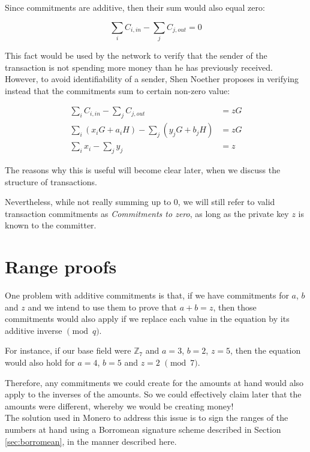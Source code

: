 Since commitments are additive, then their sum would also equal zero:

\[\sum_{i}{C_{i, in}}     - \sum_{j}{C_{j, out}} = 0\]


This fact would be used by the network to verify that the sender of the transaction is not spending more money
than he has previously received.
\\

However, to avoid identifiability of a sender, Shen Noether proposes in \cite{cryptoeprint:2015:1098} verifying instead that the commitments sum to certain non-zero value:

\begin{align*}
\sum_{i}{C_{i, in}}     - \sum_{j}{C_{j, out}} &= z G \\
\sum_{i}{(x_i G + a_i H)}  - \sum_{j}{(y_j G + b_j H)} &= z G \\
\sum_{i} x_i - \sum_{j} y_j &= z
\end{align*}

The reasons why this is useful will become clear later, when we discuss the structure of transactions. 

Nevertheless, while not really summing up to \(0\), we will still refer to valid transaction commitments as {\em Commitments to zero}, as long as the private key \(z\) is known to the committer.




\section{Range proofs}
\label{sec:range_proofs}

One problem with additive commitments is that, if we have commitments for \(a\), \(b\) and \(z\) and we intend to use them to prove that \(a + b = z\), then those commitments would also apply if we replace each value in the equation by its additive inverse \(\pmod q\).

For instance, if our base field were \(\mathbb{Z}_7 \) and \(a = 3\), \(b = 2\), \(z = 5\), then the equation would also hold for \(a = 4\), \(b = 5\) and \(z = 2\) \(\pmod 7\). 

Therefore, any commitments we could create for the amounts at hand would also apply to the inverses of the amounts.
So we could effectively claim later that the amounts were different, whereby we would be creating money!
\\

The solution used in Monero to address this issue is to sign the ranges of the numbers at hand
using a Borromean signature scheme described in Section \ref{sec:borromean}, in the manner described here.
\\


